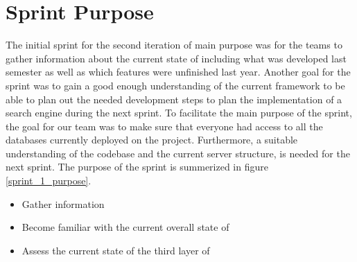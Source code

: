 \section{Sprint Purpose}
The initial sprint for the second iteration of \knox{} main purpose was for the teams to gather information about the current state of \knox{} including what was developed last semester as well as which features were unfinished last year. 
Another goal for the sprint was to gain a good enough understanding of the current framework to be able to plan out the needed development steps to plan the implementation of a search engine during the next sprint. 
To facilitate the main purpose of the sprint, the goal for our team was to make sure that everyone had access to all the databases currently deployed on the \knox{} project. 
Furthermore, a suitable understanding of the codebase and the current server structure, is needed for the next sprint.
The purpose of the sprint is summerized in figure \ref{sprint_1_purpose}.

\begin{itemize}
    \item Gather information
    \item Become familiar with the current overall state of \knox{}
    \item Assess the current state of the third layer of \knox{}
\end{itemize}